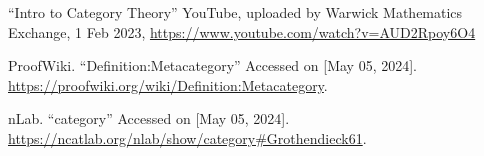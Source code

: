 \begin{thebibliography}{99}
	

``Intro to Category Theory'' YouTube, uploaded by Warwick Mathematics Exchange, 1 Feb 2023, \url{https://www.youtube.com/watch?v=AUD2Rpoy6O4}

ProofWiki. ``Definition:Metacategory'' Accessed on [May 05, 2024]. \url{https://proofwiki.org/wiki/Definition:Metacategory}.

nLab. ``category'' Accessed on [May 05, 2024]. \url{https://ncatlab.org/nlab/show/category#Grothendieck61}.
	
\end{thebibliography}